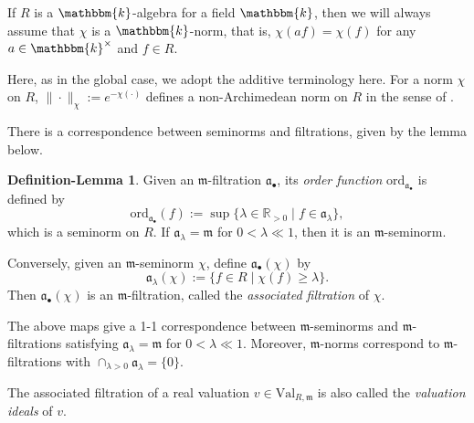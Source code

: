 \documentclass[11pt, leqno]{amsart}%
\theoremstyle{plain}
\theoremstyle{definition}
\newtheorem{deflem}[theorem]{Definition-Lemma}
\theoremstyle{remark}
\newcommand{\bR}{\mathbb{R}}
\newcommand{\fa}{\mathfrak{a}}
\newcommand{\fm}{\mathfrak{m}}
\newcommand{\ord}{\mathrm{ord}}
\newcommand{\Val}{\mathrm{Val}}
\newcommand{\bk}{\mathbbm{k}}
\numberwithin{equation}{section}
\begin{document}
If $R$ is a $\bk$-algebra for a field $\bk$, then we will always assume that $\chi$ is a $\bk$-norm, that is, $\chi(af)=\chi(f)$ for any $a\in \bk^\times$ and $f\in R$. 

Here, as in the global case, we adopt the additive terminology here. For a norm $\chi$ on $R$, $\|\cdot\|_\chi:=e^{-\chi(\cdot)}$ defines a non-Archimedean norm on $R$ in the sense of \cite{BGR84}. 





There is a correspondence between seminorms and filtrations, given by the lemma below.

\begin{deflem}\label{deflem:fm-equivalence}
    Given an $\fm$-filtration $\fa_\bullet$, its \emph{order function} $\ord_{\fa_\bullet}$ is defined by 
    \begin{equation}\label{eqn:order}
        \ord_{\fa_{\bullet}}(f):=\sup \{\lambda\in\bR_{>0}\mid f\in\fa_\lambda\},
    \end{equation}
    which is a seminorm on $R$. If $\fa_\lambda=\fm$ for $0<\lambda\ll 1$, then it is an $\fm$-seminorm.
	
    Conversely, given an $\fm$-seminorm $\chi$, define $\fa_\bullet(\chi)$ by
    \begin{equation}\label{eqn:associated filtration}
        \fa_\lambda(\chi):=\{f\in R\mid \chi(f)\ge \lambda\}.
    \end{equation}
    Then $\fa_\bullet(\chi)$ is an $\fm$-filtration, called the \emph{associated filtration} of $\chi$.
	
    The above maps give a 1-1 correspondence between $\fm$-seminorms and $\fm$-filtrations satisfying $\fa_\lambda=\fm$ for $0<\lambda\ll 1$. Moreover, $\fm$-norms correspond to $\fm$-filtrations with $\cap_{\lambda>0}\fa_\lambda=\{0\}$. 
\end{deflem}

The associated filtration of a real valuation $v\in\Val_{R,\fm}$ is also called the \emph{valuation ideals} of $v$.
\end{document}
